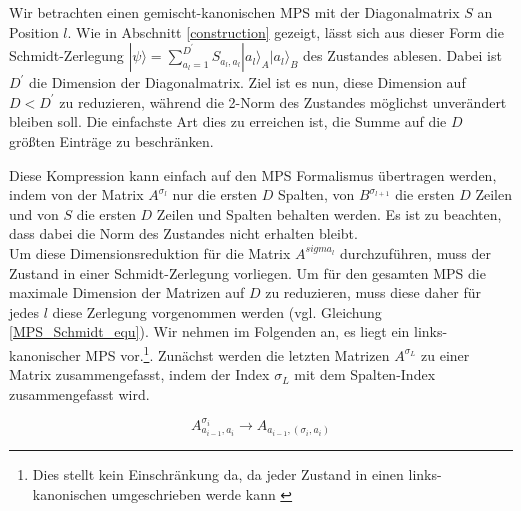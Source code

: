 \documentclass[10pt,a4paper]{report}
\begin{document}
Wir betrachten einen gemischt-kanonischen MPS mit der Diagonalmatrix $S$ an Position $l$. Wie in Abschnitt \ref{construction} gezeigt, lässt sich aus dieser Form die Schmidt-Zerlegung $|\psi\rangle=\sum_{a_l=1}^{D^{\prime}} S_{a_l,a_l}|a_l\rangle_A|a_l\rangle_B$ des Zustandes ablesen. Dabei ist $D^\prime$ die Dimension der Diagonalmatrix. Ziel ist es nun, diese Dimension auf $D<D^\prime$ zu reduzieren, während die 2-Norm des Zustandes möglichst unverändert bleiben soll.
Die einfachste Art dies zu erreichen ist, die Summe auf die $D$ größten Einträge zu beschränken.


Diese Kompression kann einfach auf den MPS Formalismus übertragen werden, indem von der Matrix $A^{\sigma_l}$ nur die ersten $D$ Spalten, von $B^{\sigma_{l+1}}$ die ersten $D$ Zeilen und von $S$ die ersten $D$ Zeilen und Spalten behalten werden. Es ist zu beachten, dass dabei die Norm des Zustandes nicht erhalten bleibt.\\

Um diese Dimensionsreduktion für die Matrix $A^{sigma_l}$ durchzuführen, muss der Zustand in einer Schmidt-Zerlegung vorliegen. Um für den gesamten MPS die maximale Dimension der Matrizen auf $D$ zu reduzieren, muss diese daher für jedes $l$ diese Zerlegung vorgenommen werden (vgl. Gleichung \ref{MPS_Schmidt_equ}). Wir nehmen im Folgenden an, es liegt ein links-kanonischer MPS vor.\footnote{Dies stellt kein Einschränkung da, da jeder Zustand in einen links-kanonischen umgeschrieben werde kann \cite{page=129,MPS-main}}. Zunächst werden die letzten Matrizen $A^{\sigma_L}$ zu einer Matrix zusammengefasst, indem der Index $\sigma_L$ mit dem Spalten-Index zusammengefasst wird.

\begin{equation}
A_{a_{i-1},a_i}^{\sigma_i}\rightarrow A_{a_{i-1},(\sigma_i,a_i)}
\end{equation}
\end{document}
